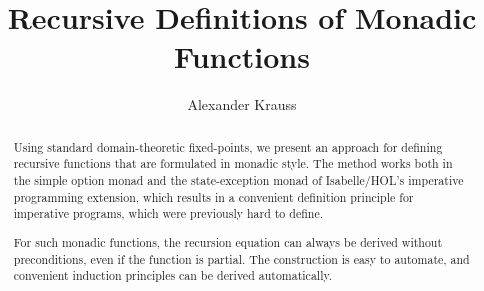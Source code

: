 \documentclass[copyright,creativecommons,sharealike]{eptcs}
\title{Recursive Definitions of Monadic Functions}
\author{Alexander Krauss
\institute{Technische Universität München, Institut für Informatik}
\email{\url{http://www.in.tum.de/~krauss}}
}
\theoremstyle{remark}
\begin{document}
\maketitle

\begin{abstract}
  
Using standard domain-theoretic fixed-points, we present an approach
for defining recursive functions that are formulated in monadic style.
The method works both in the simple option monad and the
state-exception monad of Isabelle/HOL's imperative programming
extension, which results in a convenient definition principle for
imperative programs, which were previously hard to define.

For such monadic functions, the recursion equation can always be
derived without preconditions, even if the function is partial. The
construction is easy to automate, and convenient induction principles
can be derived automatically.

\end{abstract}
\end{document}
